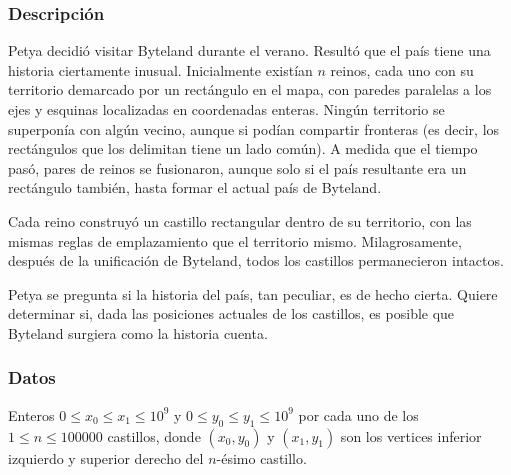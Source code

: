 %
%
%
%

\subsubsection{Descripción}

Petya decidió visitar Byteland durante el verano. Resultó que el país tiene una historia ciertamente inusual. Inicialmente existían \(n\) reinos, cada uno con su territorio demarcado por un rectángulo en el mapa, con paredes paralelas a los ejes y esquinas localizadas en coordenadas enteras. Ningún territorio se superponía con algún vecino, aunque si podían compartir fronteras (es decir, los rectángulos que los delimitan tiene un lado común). A medida que el tiempo pasó, pares de reinos se fusionaron, aunque solo si el país resultante era un rectángulo también, hasta formar el actual país de Byteland.

Cada reino construyó un castillo rectangular dentro de su territorio, con las mismas reglas de emplazamiento que el territorio mismo. Milagrosamente, después de la unificación de Byteland, todos los castillos permanecieron intactos.

Petya se pregunta si la historia del país, tan peculiar, es de hecho cierta. Quiere determinar si, dada las posiciones actuales de los castillos, es posible que Byteland surgiera como la historia cuenta.

\subsubsection{Datos}

Enteros \(0\leq x_0\leq x_1\leq10^9\) y \(0\leq y_0\leq y_1\leq10^9\) por cada uno de los \(1\leq n\leq 100000\) castillos, donde \(\left(x_0,y_0\right)\) y \(\left(x_1,y_1\right)\) son los vertices inferior izquierdo y superior derecho del \(n\)-ésimo castillo.

